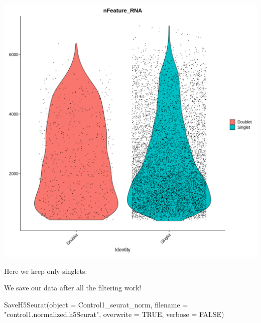 \documentclass[
  letterpaper,
  DIV=11,
  numbers=noendperiod]{scrartcl}
\newenvironment{Shaded}{\begin{snugshade}}{\end{snugshade}}
\newcommand{\AttributeTok}[1]{\textcolor[rgb]{0.40,0.45,0.13}{#1}}
\newcommand{\ConstantTok}[1]{\textcolor[rgb]{0.56,0.35,0.01}{#1}}
\newcommand{\DecValTok}[1]{\textcolor[rgb]{0.68,0.00,0.00}{#1}}
\newcommand{\FunctionTok}[1]{\textcolor[rgb]{0.28,0.35,0.67}{#1}}
\newcommand{\NormalTok}[1]{\textcolor[rgb]{0.00,0.23,0.31}{#1}}
\newcommand{\OtherTok}[1]{\textcolor[rgb]{0.00,0.23,0.31}{#1}}
\newcommand{\SpecialCharTok}[1]{\textcolor[rgb]{0.37,0.37,0.37}{#1}}
\newcommand{\StringTok}[1]{\textcolor[rgb]{0.13,0.47,0.30}{#1}}
\begin{document}
\includegraphics{tutorial-2024_files/figure-pdf/cell-42-output-1.png}

Here we keep only singlets:

\begin{Shaded}
\end{Shaded}

We save our data after all the filtering work!

\begin{Shaded}
\begin{Highlighting}[]
\FunctionTok{SaveH5Seurat}\NormalTok{(}\AttributeTok{object =}\NormalTok{ Control1\_seurat\_norm, }
             \AttributeTok{filename =} \StringTok{"control1.normalized.h5Seurat"}\NormalTok{, }
             \AttributeTok{overwrite =} \ConstantTok{TRUE}\NormalTok{,}
             \AttributeTok{verbose =} \ConstantTok{FALSE}\NormalTok{)}
\end{Highlighting}
\end{Shaded}
\end{document}
